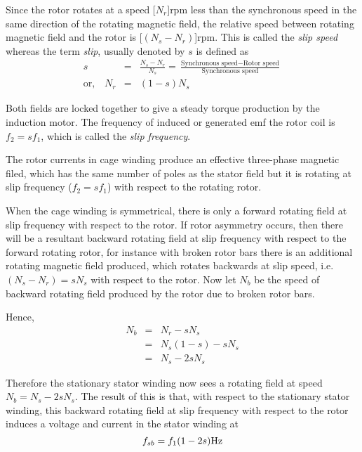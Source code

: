 \documentclass[a4paper,11pt]{report}
\begin{document}
Since the rotor rotates at a speed \unit[$N_{r}$]{rpm} less than the synchronous speed in the same direction of the rotating magnetic field, the relative speed between rotating magnetic field and the rotor is \unit[$(N_{s} - N_{r})$]{rpm}. This is called the \emph{slip speed} whereas the term \emph{slip}, usually denoted by $s$ is defined as
\begin{eqnarray*}
s &=& \frac{N_{s}-N_{r}}{N_{s}}=\frac{\textrm{Synchronous speed}-\textrm{Rotor speed}}{\textrm{Synchronous speed}} \\
\textrm{or,} \quad N_{r} &=& (1-s)N_{s}
\end{eqnarray*}

Both fields are locked together to give a steady torque production by the induction motor. The frequency of induced or generated emf the rotor coil is $f_{2}=sf_{1}$, which is called the \emph{slip frequency}.

The rotor currents in cage winding produce an effective three-phase magnetic filed, which has the same number of poles as the stator field but it is rotating at slip frequency ($f_{2}=sf_{1}$) with respect to the rotating rotor. 

When the cage winding is symmetrical, there is only a forward rotating field at slip frequency with respect to the rotor. If rotor asymmetry occurs, then there will be a resultant backward rotating field at slip frequency with respect to the forward rotating rotor, for instance with broken rotor bars there is an additional rotating magnetic field produced, which rotates backwards at slip speed, i.e. $(N_{s} - N_{r}) = sN_{s}$ with respect to the rotor.
Now let $N_{b}$ be the speed of backward rotating field produced by the rotor due to broken rotor bars.

Hence,
\begin{eqnarray}
N_{b} & = &N_{r} - sN_{s}  \nonumber \\
 &=& N_{s}(1-s) - sN_{s}  \nonumber \\
 &=& N_{s} - 2sN_{s}  
\end{eqnarray}

Therefore the stationary stator winding now sees a rotating field at speed $N_{b} = N_{s} - 2sN_{s}$. The result of this is that, with respect to the stationary stator winding, this backward rotating field at slip frequency with respect to the rotor induces a voltage and current in the stator winding at
\begin{equation}
f_{sb}=f_{1}(1-2s) \unit[]{Hz}
\end{equation}
\end{document}
